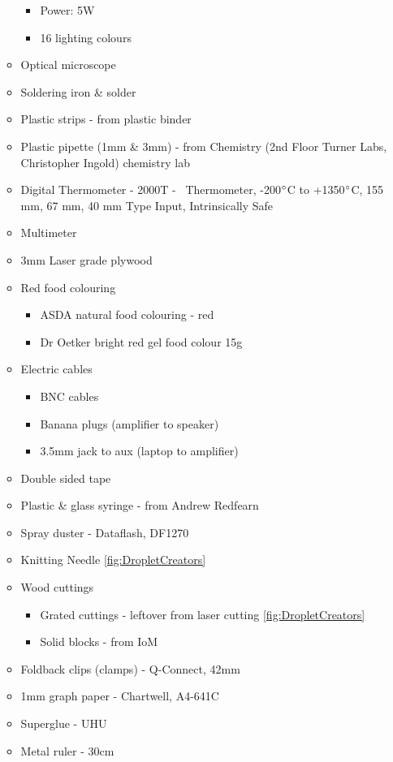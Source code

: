 \begin{enumerate}
\begin{itemize}
\begin{itemize}
\item Power: 5W
\item 16 lighting colours
\end{itemize}
\item Optical microscope
\item Soldering iron \& solder
\item Plastic strips - from plastic binder
\item Plastic pipette (1mm \& 3mm) - from Chemistry (2nd Floor Turner Labs, Christopher Ingold) chemistry lab
\item Digital Thermometer - 2000T - \ Thermometer, -200$\degree$C to +1350$\degree$C, 155 mm, 67 mm, 40 mm Type Input, Intrinsically Safe
\item Multimeter
\item 3mm Laser grade plywood
\item Red food colouring

\begin{itemize}
\item ASDA natural food colouring - red
\item Dr Oetker bright red gel food colour 15g
\end{itemize}
\item Electric cables

\begin{itemize}
\item BNC cables
\item Banana plugs (amplifier to speaker)
\item 3.5mm jack to aux (laptop to amplifier)
\end{itemize}

\item Double sided tape
\item Plastic \& glass syringe - from Andrew Redfearn
\item Spray duster - Dataflash, DF1270
\item Knitting Needle \ref{fig:DropletCreators}
\item Wood cuttings

\begin{itemize}
\item Grated cuttings - leftover from laser cutting \ref{fig:DropletCreators}
\item Solid blocks - from IoM
\end{itemize}
\item Foldback clips (clamps) - Q-Connect, 42mm
\item 1mm graph paper - Chartwell, A4-641C
\item Superglue - UHU
\item Metal ruler - 30cm
\end{itemize}
\end{enumerate}

